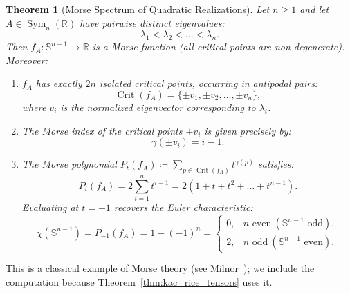 \documentclass[11pt,a4paper,reqno]{amsart}
\newtheorem{theorem}{Theorem}[section]
\theoremstyle{definition}
\numberwithin{equation}{section}
\newcommand{\R}{\mathbb{R}}
\newcommand{\Sph}{\mathbb{S}}
\begin{document}
\begin{theorem}[Morse Spectrum of Quadratic Realizations]
\label{thm:morse_matrix}
Let $n \ge 1$ and let $A \in \operatorname{Sym}_n(\R)$ have pairwise distinct eigenvalues:
\begin{equation}
    \lambda_1 < \lambda_2 < \dots < \lambda_n.
\end{equation}
Then $f_A \colon \Sph^{n-1} \to \R$ is a Morse function (all critical points are non-degenerate). Moreover:
\begin{enumerate}[label=(\roman*)]
    \item $f_A$ has exactly $2n$ isolated critical points, occurring in antipodal pairs:
    \begin{equation}
        \operatorname{Crit}(f_A) = \{\pm v_1, \pm v_2, \dots, \pm v_n\},
    \end{equation}
    where $v_i$ is the normalized eigenvector corresponding to $\lambda_i$.
    \item The Morse index of the critical points $\pm v_i$ is given precisely by:
    \begin{equation}
        \gamma(\pm v_i) = i - 1.
    \end{equation}
    \item The Morse polynomial $P_t(f_A) \coloneqq \sum_{p \in \operatorname{Crit}(f_A)} t^{\gamma(p)}$ satisfies:
    \begin{equation}
        P_t(f_A) = 2 \sum_{i=1}^n t^{i-1} = 2 (1 + t + t^2 + \dots + t^{n-1}).
    \end{equation}
    Evaluating at $t = -1$ recovers the Euler characteristic:
    \begin{equation}
        \chi(\Sph^{n-1}) = P_{-1}(f_A) = 1 - (-1)^n = \begin{cases} 0, & n \text{ even} \ (\Sph^{n-1} \text{ odd}), \\ 2, & n \text{ odd} \ (\Sph^{n-1} \text{ even}). \end{cases}
    \end{equation}
\end{enumerate}
\end{theorem}
This is a classical example of Morse theory (see Milnor~\cite{milnor1963morse}); we include the computation because Theorem~\ref{thm:kac_rice_tensors} uses it.
\end{document}
